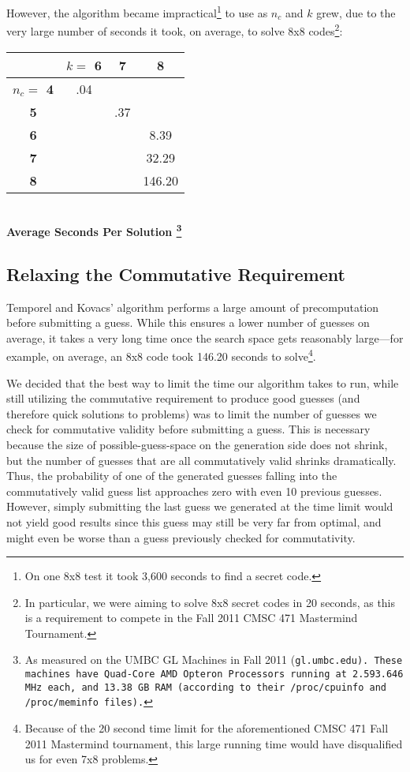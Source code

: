 \documentclass[11pt,twocolumn]{article}
\begin{document}
However, the algorithm became impractical\footnote{On one 8x8 test it took 3,600 seconds to find a secret code.} to use as $n_c$ and $k$ grew, due to the very large number of seconds it took, on average, to solve 8x8 codes\footnote{In particular, we were aiming to solve 8x8 secret codes in 20 seconds, as this is a requirement to compete in the Fall 2011 CMSC 471 Mastermind Tournament.}:
\begin{center}
\begin{tabular}{|c|c|c|c|}
\hline
        &\bf  $k= $ 6 & \bf 7 & \bf 8 \\
\hline
\bf $n_c = $ 4 & .04   &   &   \\
\hline
\bf 5       &       &.37&   \\
\hline
\bf 6       &       &   &8.39 \\
\hline
\bf 7       &       &   &32.29 \\
\hline
\bf 8       &       &   &146.20 \\
\hline
\end{tabular}\\


\bf Average Seconds Per Solution  \footnote{As measured on the UMBC GL Machines in Fall 2011 (\tt gl.umbc.edu\rm). These machines have Quad-Core AMD Opteron Processors running at 2.593.646 MHz each, and 13.38 GB RAM (according to their \tt /proc/cpuinfo \rm and \tt /proc/meminfo \rm  files).}\rm

\end{center}

\subsection{Relaxing the Commutative Requirement}

Temporel and Kovacs' algorithm performs a large amount of precomputation before submitting a guess. While this ensures a lower number of guesses on average, it takes a very long time once the search space gets reasonably large---for example, on average, an 8x8 code took 146.20 seconds to solve\footnote{Because of the 20 second time limit for the aforementioned CMSC 471 Fall 2011 Mastermind tournament, this large running time would have disqualified us for even 7x8 problems.}. 

We decided that the best way to limit the time our algorithm takes to run, while still utilizing the commutative requirement to produce good guesses (and therefore quick solutions to problems) was to limit the number of guesses we check for commutative validity before submitting a guess. This is necessary because the size of possible-guess-space on the generation side does not shrink, but the number of guesses that are all commutatively valid shrinks dramatically. Thus, the probability of one of the generated guesses falling into the commutatively valid guess list approaches zero with even 10 previous guesses. However, simply submitting the last guess we generated at the time limit would not yield good results since this guess may still be very far from optimal, and might even be worse than a guess previously checked for commutativity. 
\end{document}
